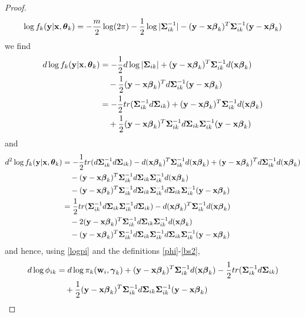 \begin{proof}
\begin{align*}
\log f_{k}(\mathbf y|\mathbf x,\boldsymbol\theta_{k})=-\frac{m}{2}\log(2\pi)-\frac{1}{2}\log |\boldsymbol\Sigma_{ik}^{-1}|-(\mathbf y-\mathbf x\boldsymbol \beta_{k})^{T}\boldsymbol\Sigma_{ik}^{-1}(\mathbf y-\mathbf x\boldsymbol\beta_{k})
\end{align*}
we find 
\begin{align*}
d\log f_{k}(\mathbf y|\mathbf x,\boldsymbol\theta_{k})&=-\frac{1}{2}d\log|\boldsymbol\Sigma_{ik}|+(\mathbf y-\mathbf x\boldsymbol \beta_{k})^{T}\boldsymbol\Sigma_{ik}^{-1}d(\mathbf x\boldsymbol \beta_{k})\\
&\quad-\frac{1}{2}(\mathbf y-\mathbf x\boldsymbol \beta_{k})^{T}d\boldsymbol\Sigma_{ik}^{-1}(\mathbf y-\mathbf x\boldsymbol\beta_{k})\\
&=-\frac{1}{2}tr(\boldsymbol\Sigma_{ik}^{-1}d\boldsymbol\Sigma_{ik})+(\mathbf y-\mathbf x\boldsymbol \beta_{k})^{T}\boldsymbol\Sigma_{ik}^{-1}d(\mathbf x\boldsymbol \beta_{k})\\
&\quad+\frac{1}{2}(\mathbf y-\mathbf x\boldsymbol \beta_{k})^{T}\boldsymbol\Sigma_{ik}^{-1}d\boldsymbol\Sigma_{ik}\boldsymbol\Sigma_{ik}^{-1}(\mathbf y-\mathbf x\boldsymbol\beta_{k})\\
\end{align*}
and
\begin{align*}
d^{2}\log f_{k}(\mathbf y|\mathbf x,\boldsymbol\theta_{k})&=-\frac{1}{2}tr(d\boldsymbol\Sigma_{ik}^{-1}d\boldsymbol\Sigma_{ik})-d(\mathbf x\boldsymbol \beta_{k})^{T}\boldsymbol\Sigma_{ik}^{-1}d(\mathbf x\boldsymbol \beta_{k})+(\mathbf y-\mathbf x\boldsymbol \beta_{k})^{T}d\boldsymbol\Sigma_{ik}^{-1}d(\mathbf x\boldsymbol \beta_{k})\\
&\quad-(\mathbf y-\mathbf x\boldsymbol \beta_{k})^{T}\boldsymbol\Sigma_{ik}^{-1}d\boldsymbol\Sigma_{ik}\boldsymbol\Sigma_{ik}^{-1}d(\mathbf x\boldsymbol\beta_{k})\\
&\quad-(\mathbf y-\mathbf x\boldsymbol \beta_{k})^{T}\boldsymbol\Sigma_{ik}^{-1}d\boldsymbol\Sigma_{ik}\boldsymbol\Sigma_{ik}^{-1}d\boldsymbol\Sigma_{ik}\boldsymbol\Sigma_{ik}^{-1}(\mathbf y-\mathbf x\boldsymbol\beta_{k})\\
&=\frac{1}{2}tr(\boldsymbol\Sigma_{ik}^{-1}d\boldsymbol\Sigma_{ik}\boldsymbol\Sigma_{ik}^{-1}d\boldsymbol\Sigma_{ik})-d(\mathbf x\boldsymbol \beta_{k})^{T}\boldsymbol\Sigma_{ik}^{-1}d(\mathbf x\boldsymbol \beta_{k})\\
&\quad-2(\mathbf y-\mathbf x\boldsymbol \beta_{k})^{T}\boldsymbol\Sigma_{ik}^{-1}d\boldsymbol\Sigma_{ik}\boldsymbol\Sigma_{ik}^{-1}d(\mathbf x\boldsymbol\beta_{k})\\
&\quad-(\mathbf y-\mathbf x\boldsymbol \beta_{k})^{T}\boldsymbol\Sigma_{ik}^{-1}d\boldsymbol\Sigma_{ik}\boldsymbol\Sigma_{ik}^{-1}d\boldsymbol\Sigma_{ik}\boldsymbol\Sigma_{ik}^{-1}(\mathbf y-\mathbf x\boldsymbol\beta_{k})\\
\end{align*}
and hence, using \eqref{logpi} and the definitions \eqref{phi}-\eqref{bs2},
\begin{align*}
d\log \phi_{ik}&=d\log \pi_{k}(\B w_{i},\BS\gamma_k)+(\B y-\B x\BS \beta_{k})^{T}\BS\Sigma_{ik}^{-1}d(\B x\BS \beta_{k})-\frac{1}{2}tr(\BS\Sigma_{ik}^{-1}d\BS\Sigma_{ik})\\
&\quad+\frac{1}{2}(\B y-\B x\BS \beta_{k})^{T}\BS\Sigma_{ik}^{-1}d\BS\Sigma_{ik}\BS\Sigma_{ik}^{-1}(\B y-\B x\BS\beta_{k})\\

\end{align*}
\end{proof}
